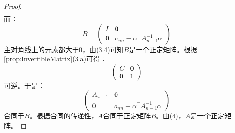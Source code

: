 \begin{proof}
\begin{align*}
	\end{align*}
	而：
	\begin{equation*}
		B=
		\begin{pmatrix}
			I & \mathbf{0} \\
			\mathbf{0} & a_{nn}-\alpha^{\top}A_{n-1}^{-1}\alpha
		\end{pmatrix}
	\end{equation*}
	主对角线上的元素都大于$0$，由(3.4)可知$B$是一个正定矩阵。根据\cref{prop:InvertibleMatrix}(3.a)可得：
	\begin{equation*}
		\begin{pmatrix}
			C & \mathbf{0} \\
			\mathbf{0} & 1
		\end{pmatrix}
	\end{equation*}
	可逆。于是：
	\begin{equation*}
		\begin{pmatrix}
			A_{n-1} & \mathbf{0} \\
			\mathbf{0} & a_{nn}-\alpha^{\top}A_{n-1}^{-1}\alpha
		\end{pmatrix}
	\end{equation*}
	合同于$B$。根据合同的传递性，$A$合同于正定矩阵$B$。由(4)，$A$是一个正定矩阵。
\end{proof}
